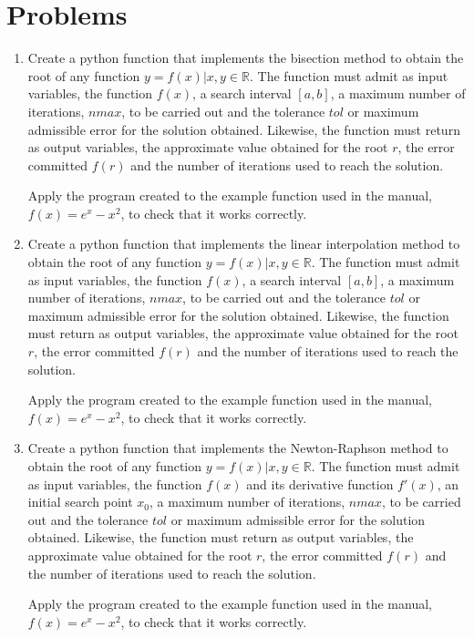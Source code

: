 \section{Problems}
\begin{enumerate}
\item 
Create a python function that implements the bisection method to obtain the root of any function $y = f(x)\vert x, y \in \mathbb{R}$. The function must admit as input variables, the function $f(x)$, a search interval $[a,b]$, a maximum number of iterations, $nmax$, to be carried out and the tolerance $tol$ or maximum admissible error for the solution obtained. Likewise, the function must return as output variables, the approximate value obtained for the root $r$, the error committed $f(r)$ and the number of iterations used to reach the solution. 

Apply the program created to the example function used in the manual, $f(x) = e^x-x^2$, to check that it works correctly.

\item Create a python function that implements the linear interpolation method to obtain the root of any function $y = f(x)\vert x, y \in \mathbb{R}$. The function must admit as input variables, the function $f(x)$, a search interval $[a,b]$, a maximum number of iterations, $nmax$, to be carried out and the tolerance $tol$ or maximum admissible error for the solution obtained. Likewise, the function must return as output variables, the approximate value obtained for the root $r$, the error committed $f(r)$ and the number of iterations used to reach the solution.

Apply the program created to the example function used in the manual, $f(x) = e^x-x^2$, to check that it works correctly.

\item Create a python function that implements the Newton-Raphson method to obtain the root of any function $y = f(x)\vert x, y \in \mathbb{R}$. The function must admit as input variables, the function $f(x)$ and its derivative function $f'(x)$, an initial search point $x_0$, a maximum number of iterations, $nmax$, to be carried out and the tolerance $tol$ or maximum admissible error for the solution obtained. Likewise, the function must return as output variables, the approximate value obtained for the root $r$, the error committed $f(r)$ and the number of iterations used to reach the solution.

Apply the program created to the example function used in the manual, $f(x) = e^x-x^2$, to check that it works correctly.


\end{enumerate}
